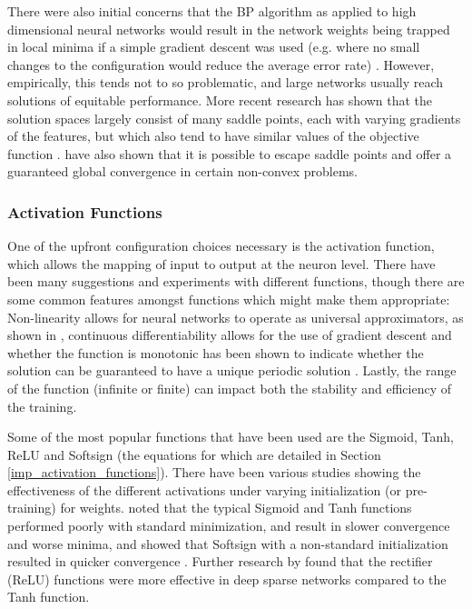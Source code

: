 \documentclass[a4paper,11pt,oneside]{article}
\theoremstyle{plain}
\theoremstyle{definition}
\begin{document}
	There were also initial concerns that the BP algorithm as applied to high dimensional neural networks would result 
	in the network weights being trapped in local minima if a simple gradient descent was used (e.g. where no small 
	changes to the configuration would reduce the average error rate) \citep{LeCun4}. 
	However, empirically, this tends not to so problematic, and large networks usually reach solutions of equitable 
	performance. More recent research has shown that the solution spaces largely consist of many saddle points, each 
	with varying gradients of the features, but which also tend to have similar values of the objective function \citep{Dauphin}. 
	\citet{Ge} have also shown that it is possible to escape saddle points and offer a guaranteed global convergence 
	in certain non-convex problems.
	\hfill \break 
	
	\subsubsection{Activation Functions}\label{lr_activationfunctions}
	
	One of the upfront configuration choices necessary is the activation function, which allows the mapping of input 
	to output at the neuron level. There have been many suggestions and experiments with different functions, though 
	there are some common features amongst functions which might make them appropriate: Non-linearity allows for 
	neural networks to operate as universal approximators, as shown in \citep{Hornik}, continuous differentiability allows for the 
	use of gradient descent and whether the function is monotonic has been shown to indicate whether the solution 
	can be guaranteed to have a unique periodic solution \citep{Wu}. Lastly, the range of the function (infinite or finite) can impact both the 
	stability and efficiency of the training.
	\hfill \break 
	
	Some of the most popular functions that have been used are the Sigmoid, Tanh, ReLU and Softsign (the equations for which are detailed in Section \ref{imp_activation_functions}). There have 
	been various studies showing the effectiveness of the different activations under varying initialization (or pre-training) 
	for weights. \citet{Glorot} noted that the typical Sigmoid and Tanh functions performed poorly with standard 
	minimization, and result in slower convergence and worse minima, and showed that Softsign with a non-standard 
	initialization resulted in quicker convergence . Further research by \citet{Glorot2} found that the 
	rectifier (ReLU) functions were more effective in deep sparse networks compared to the Tanh function.
	
\end{document}
